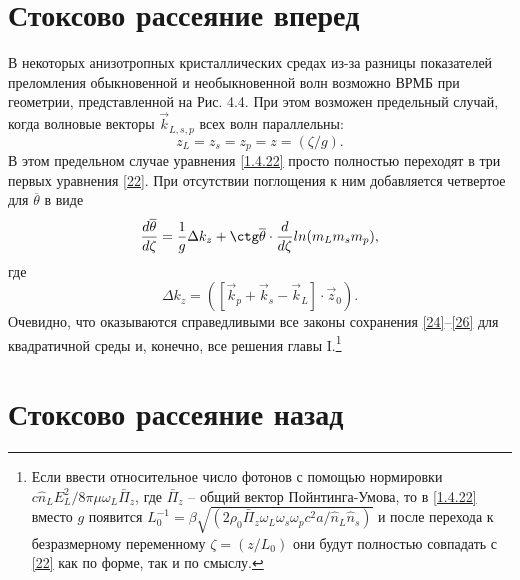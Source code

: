 \documentclass[a4paper]{article}
\begin{document}
\section{Стоксово рассеяние вперед}
В некоторых анизотропных кристаллических средах из-за разницы показателей преломления обыкновенной и необыкновенной волн возможно ВРМБ при геометрии, представленной на Рис. 4.4. При этом возможен предельный случай, когда волновые векторы $\vec{k}_{L,s,p}$ всех волн параллельны: 
\begin{equation}
	z_{L}=z_{s}=z_{p}=z=(\zeta/g).
	\label{1.4.25}
\end{equation}
В этом предельном случае уравнения \eqref{1.4.22} просто полностью переходят в три первых уравнения \eqref{22}. При отсутствии поглощения  к ним  добавляется четвертое для $\overline{\theta}$ в виде 
\begin{equation}
	\frac{d\overline{\theta}}{d\zeta}=\frac{1}{g}\Delta k_{z}+\ctg\overline{\theta}\cdot\frac{d}{d\zeta}ln(m_{L}m_{s}m_{p}),
	\label{1.4.26}
\end{equation}
где	$$\Delta k_{z}=(\left[\vec{k}_{p}+\vec{k}_{s}-\vec{k}_{L}\right]\cdot\vec{z}_{0}).$$
Очевидно, что оказываются справедливыми все законы сохранения \eqref{24}–\eqref{26} для квадратичной среды и, конечно, все решения главы I.\footnote{Если ввести относительное число фотонов с помощью нормировки $c\hat{n}_{L}E_{L}^{2}/8\pi\mu\omega_{L}\bar{\Pi}_{z}$, где $\bar{\Pi}_{z}$ -- общий вектор Пойнтинга-Умова, то в \eqref{1.4.22} вместо $g$  появится $L_{0}^{-1}=\beta\sqrt{(2\rho_{0}\bar{\Pi}_{z}\omega_{L}\omega_{s}\omega_{p}c^{2}a/\hat{n}_{L}\hat{n}_{s})}$ и после перехода к безразмерному переменному $\zeta=(z/L_{0})$  они будут полностью совпадать с \eqref{22} как по форме, так и по смыслу.} 
\section{Стоксово рассеяние назад}
\end{document}
